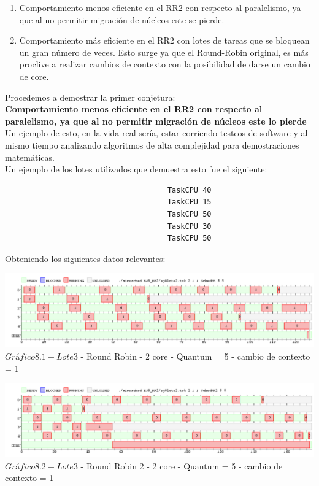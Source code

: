 \begin{enumerate}
\item Comportamiento menos eficiente en el RR2 con respecto al paralelismo, ya que al no permitir
migración de n\'ucleos este se pierde.
\item Comportamiento más eficiente en el RR2 con lotes de tareas que se bloquean un gran n\'{u}mero
de veces. Esto surge ya que el Round-Robin original, es m\'as proclive a realizar cambios de contexto con la posibilidad
de darse un cambio de core.
\end{enumerate}
 
 Procedemos a demostrar la primer conjetura:\\
 
 \textbf{Comportamiento menos eficiente en el RR2 con respecto al paralelismo, ya que al no permitir
migración de núcleos este lo pierde}\\

Un ejemplo de esto, en la vida real ser\'ia, estar corriendo testeos de software y al mismo tiempo analizando
algoritmos de alta complejidad para demostraciones matem\'{a}ticas.\\

Un ejemplo de los lotes utilizados que demuestra esto fue el siguiente:\\

\begin{verbatim}
                                     TaskCPU 40
                                     TaskCPU 15
                                     TaskCPU 50
                                     TaskCPU 30
                                     TaskCPU 50
\end{verbatim}

Obteniendo los siguientes datos relevantes:\\

\begin{center}
    	\includegraphics[width=450pt]{./EJ8_RR2/dif10corerr.png}
	{$Gr$\'a$fico 8.1 -Lote 3$ - Round Robin - 2 core - Quantum = 5 - cambio de contexto = 1}	
 \end{center}
 
 \begin{center}
    	\includegraphics[width=450pt]{./EJ8_RR2/dif10corerr2.png}
	{$Gr$\'a$fico 8.2 - Lote 3$ - Round Robin 2 - 2 core - Quantum = 5 - cambio de contexto = 1}	
 \end{center}
 
